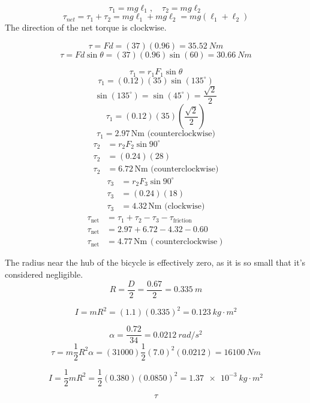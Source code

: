 \documentclass[11pt]{homework}
\begin{document}
\setcounter{questionCounter}{27}
\question
\[
\tau_1 = mg\ell_1, \quad \tau_2 =mg\ell_2
\]
\[
    \tau_{net}=\tau_1 + \tau_2 =mg\ell_1 +mg\ell_2 = mg(\ell_1+\ell_2)
\]
The direction of the net torque is clockwise.



\question
\begin{alphaparts}
\questionpart
\[
\tau=Fd = (37)(0.96)=\boxed{\qty{35.52}{Nm}}
\]
\questionpart
\[
\tau=Fd \sin\theta = (37)(0.96)\sin(60)=\boxed{\qty{30.66}{Nm}}
\]


\end{alphaparts}

\question
\[
\tau_1 = r_1 F_1 \sin \theta
\]\[
\tau_1 = (0.12)(35)\sin(135^\circ)
\]\[
\sin(135^\circ) = \sin(45^\circ) = \frac{\sqrt{2}}{2}
\]\[
\tau_1 = (0.12)(35)(\frac{\sqrt{2}}{2})
\]\[
\tau_1 = 2.97 \, \text{Nm} \text{ (counterclockwise)}
\]
\begin{align*}
\tau_2 &= r_2 F_2 \sin 90^\circ \\
\tau_2 &= (0.24)(28) \\
\tau_2 &= 6.72 \, \text{Nm} \text{ (counterclockwise)}
\end{align*}
\begin{align*}
\tau_3 &= r_2 F_3 \sin 90^\circ \\
\tau_3 &= (0.24)(18) \\
\tau_3 &= 4.32 \, \text{Nm} \text{ (clockwise)}
\end{align*}
\begin{align*}
\tau_{\text{net}} &= \tau_1 + \tau_2 - \tau_3 - \tau_{\text{friction}} \\
\tau_{\text{net}} &= 2.97 + 6.72 - 4.32 - 0.60 \\
\tau_{\text{net}} &= \boxed{4.77 \, \text{Nm}  \, (\text{counterclockwise})}
\end{align*}


\setcounter{questionCounter}{33}
\question
The radius near the hub of the bicycle is effectively zero, as it is so small that it's considered negligible.
\[
R=\frac{D}{2} = \frac{0.67}{2} = \qty{0.335}{m}
\]

\[
I = mR^2 = (1.1)(0.335)^2 = \boxed{\qty{0.123}{kg \cdot m^2}}
\]


\question
\[
\alpha=\frac{0.72}{34}=\qty{0.0212}{rad /s^2}
\]
\[
\tau = m\frac{1}{2}R^2\alpha = (31000)\frac{1}{2}(7.0)^2(0.0212)=\boxed{\qty{16100}{Nm}}
\]



\setcounter{questionCounter}{36}
\question
\begin{alphaparts}
\questionpart
\[
I = \frac{1}{2}mR^2 = \frac{1}{2}(0.380)(0.0850)^2 = \boxed{\qty{1.37e-3}{kg \cdot m^2}}
\]

\questionpart
\[
\tau
\]


\end{alphaparts}


\setcounter{questionCounter}{52}
\question


\question


\question


\setcounter{questionCounter}{63}
\question


\setcounter{questionCounter}{66}
\question


\setcounter{questionCounter}{68}
\question
\end{document}
